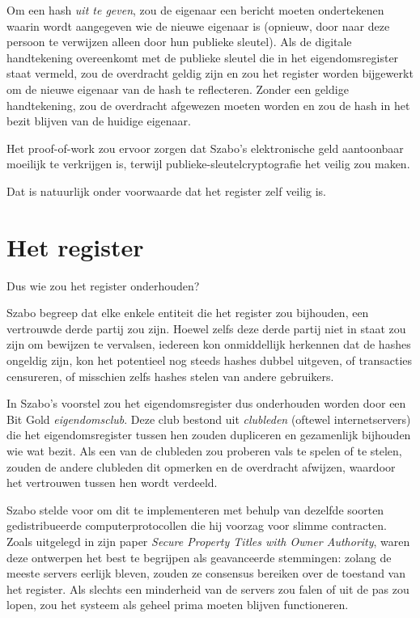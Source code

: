 \documentclass[
  a5paper,
  smalldemyvopaper,11pt,twoside,onecolumn,openright,extrafontsizes,
hidelinks]{memoir}
\begin{document}
Om een hash \emph{uit te geven}, zou de eigenaar een bericht moeten
ondertekenen waarin wordt aangegeven wie de nieuwe eigenaar is (opnieuw,
door naar deze persoon te verwijzen alleen door hun publieke sleutel).
Als de digitale handtekening overeenkomt met de publieke sleutel die in
het eigendomsregister staat vermeld, zou de overdracht geldig zijn en
zou het register worden bijgewerkt om de nieuwe eigenaar van de hash te
reflecteren. Zonder een geldige handtekening, zou de overdracht
afgewezen moeten worden en zou de hash in het bezit blijven van de
huidige eigenaar.

Het proof-of-work zou ervoor zorgen dat Szabo's elektronische geld
aantoonbaar moeilijk te verkrijgen is, terwijl
publieke-sleutelcryptografie het veilig zou maken.

Dat is natuurlijk onder voorwaarde dat het register zelf veilig is.

\section{Het register}\label{het-register}

Dus wie zou het register onderhouden?

Szabo begreep dat elke enkele entiteit die het register zou bijhouden,
een vertrouwde derde partij zou zijn. Hoewel zelfs deze derde partij
niet in staat zou zijn om bewijzen te vervalsen, iedereen kon
onmiddellijk herkennen dat de hashes ongeldig zijn, kon het potentieel
nog steeds hashes dubbel uitgeven, of transacties censureren, of
misschien zelfs hashes stelen van andere gebruikers.

In Szabo's voorstel zou het eigendomsregister dus onderhouden worden
door een Bit Gold \emph{eigendomsclub}. Deze club bestond uit
\emph{clubleden} (oftewel internetservers) die het eigendomsregister
tussen hen zouden dupliceren en gezamenlijk bijhouden wie wat bezit. Als
een van de clubleden zou proberen vals te spelen of te stelen, zouden de
andere clubleden dit opmerken en de overdracht afwijzen, waardoor het
vertrouwen tussen hen wordt verdeeld.

Szabo stelde voor om dit te implementeren met behulp van dezelfde
soorten gedistribueerde computerprotocollen die hij voorzag voor slimme
contracten. Zoals uitgelegd in zijn paper \emph{Secure Property Titles
with Owner Authority}, waren deze ontwerpen het best te begrijpen als
geavanceerde stemmingen: zolang de meeste servers eerlijk bleven, zouden
ze consensus bereiken over de toestand van het register. Als slechts een
minderheid van de servers zou falen of uit de pas zou lopen, zou het
systeem als geheel prima moeten blijven functioneren.
\end{document}
